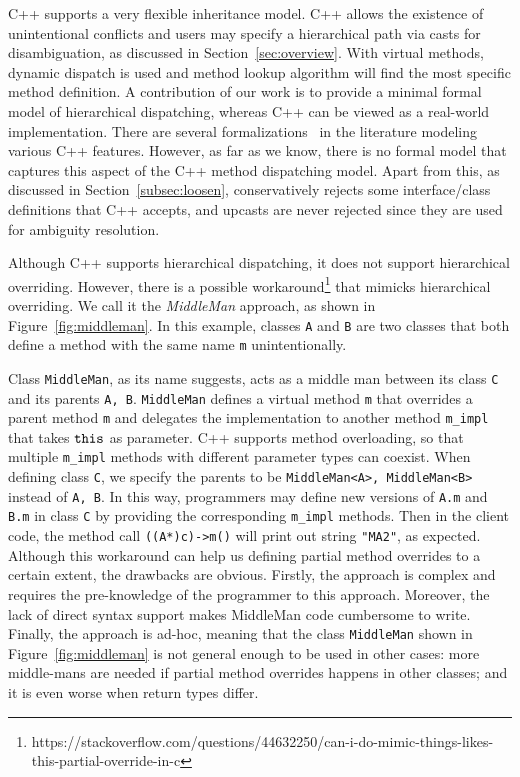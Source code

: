 C++ supports a very flexible inheritance model.
C++ allows the existence of unintentional conflicts and users may specify a hierarchical path via casts for disambiguation, as discussed in Section~\ref{sec:overview}. 
With virtual methods, dynamic dispatch is used and 
method lookup algorithm will find the most specific method definition. 
A contribution of our work is to provide a minimal formal model of
hierarchical dispatching, whereas C++ can be viewed as a real-world
implementation. There are several
formalizations~\cite{Wasserrab2006,ramananandro2012mechanized,Ramalingam1997}
in the literature modeling various C++ features. However, as far as we know, there is no formal model that
captures this aspect of the C++ method dispatching model. Apart from this, as discussed in Section~\ref{subsec:loosen}, \name{} conservatively rejects some interface/class definitions that C++ accepts, and upcasts are never rejected since they are used for ambiguity resolution.

Although C++ supports hierarchical dispatching, it does not support
hierarchical overriding.  However, there is a possible
workaround\footnote{https://stackoverflow.com/questions/44632250/can-i-do-mimic-things-likes-this-partial-override-in-c} that mimicks hierarchical
overriding.  We call it the \emph{MiddleMan} approach, as shown in
Figure~\ref{fig:middleman}. In this example, classes \texttt{A} and
\texttt{B} are two classes that both define a method with the same
name \texttt{m}
unintentionally.

Class \texttt{MiddleMan}, as its name suggests, acts as a middle man between its class \texttt{C} and its parents \texttt{A, B}. \texttt{MiddleMan} defines a virtual method \texttt{m} that overrides a parent method \texttt{m} and delegates the implementation to another method \texttt{m\_impl} that takes $\texttt{this}$ as parameter. C++ supports method overloading, so that multiple \texttt{m\_impl} methods with different parameter types can coexist. When defining class \texttt{C}, we specify the parents to be \texttt{MiddleMan<A>, MiddleMan<B>} instead of \texttt{A, B}. In this way, programmers may define new versions of \texttt{A.m} and \texttt{B.m} in class \texttt{C} by providing the corresponding \texttt{m\_impl} methods. Then in the client code, the method call \texttt{((A*)c)->m()} will print out string \texttt{"MA2"}, as expected. Although this workaround can help us defining partial method overrides to a certain extent, the drawbacks are obvious. Firstly, the approach is complex and requires the pre-knowledge of the programmer to this approach. Moreover, the lack of direct syntax support makes MiddleMan code cumbersome to write. Finally, the approach is ad-hoc, meaning that the class \texttt{MiddleMan} shown in Figure~\ref{fig:middleman} is not general enough to be used in other cases: more middle-mans are needed if partial method overrides happens in other classes; and it is even worse when return types differ.

